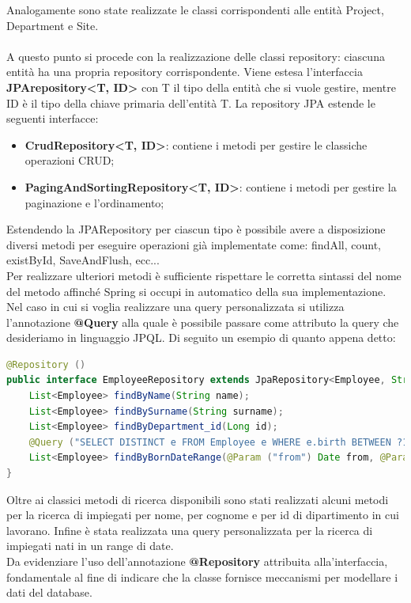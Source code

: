 Analogamente sono state realizzate le classi corrispondenti alle entità Project, Department e Site.\\\\
A questo punto si procede con la realizzazione delle classi repository: ciascuna entità ha una propria repository corrispondente. Viene estesa l'interfaccia \textbf{JPArepository<T, ID>} con T il tipo della entità che si vuole gestire, mentre ID è il tipo della chiave primaria dell'entità T. La repository JPA estende le seguenti interfacce:
\begin{itemize}
  \item \textbf{CrudRepository<T, ID>}: contiene i metodi per gestire le classiche operazioni CRUD;
  \item \textbf{PagingAndSortingRepository<T, ID>}: contiene i metodi per gestire la paginazione e l'ordinamento;
\end{itemize}
Estendendo la JPARepository per ciascun tipo è possibile avere a disposizione diversi metodi per eseguire operazioni già implementate come: findAll, count, existById, SaveAndFlush, ecc...\\
Per realizzare ulteriori metodi è sufficiente rispettare le corretta sintassi del nome del metodo affinché Spring si occupi in automatico della sua implementazione.\\
Nel caso in cui si voglia realizzare una query personalizzata si utilizza l'annotazione \textbf{@Query} alla quale è possibile passare come attributo la query che desideriamo in linguaggio JPQL. Di seguito un esempio di quanto appena detto:
\begin{lstlisting}[language=Java, title={EmployeeRepository.java}, morecomment={[s][\color{DarkOrchid}]{@}{\ }},  morecomment={[s][\color{OliveGreen}]{"}{"}},]
@Repository ()
public interface EmployeeRepository extends JpaRepository<Employee, String> {
    List<Employee> findByName(String name);
    List<Employee> findBySurname(String surname);
    List<Employee> findByDepartment_id(Long id);
    @Query ("SELECT DISTINCT e FROM Employee e WHERE e.birth BETWEEN ?1 AND ?2")
    List<Employee> findByBornDateRange(@Param ("from") Date from, @Param ("to") Date to);
}
\end{lstlisting}
Oltre ai classici metodi di ricerca disponibili sono stati realizzati alcuni metodi per la ricerca di impiegati per nome, per cognome e per id di dipartimento in cui lavorano. Infine è stata realizzata una query personalizzata per la ricerca di impiegati nati in un range di date.\\
Da evidenziare l'uso dell'annotazione \textbf{@Repository} attribuita alla'interfaccia, fondamentale al fine di indicare che la classe fornisce meccanismi per modellare i dati del database.
